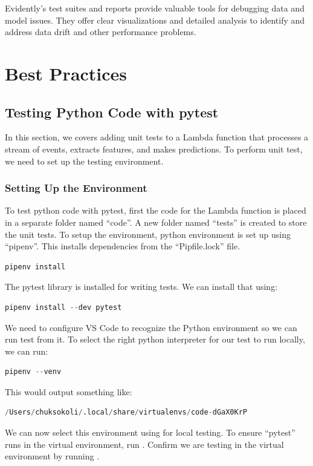 \documentclass[letterpaper,12pt,notitlepage,twoside]{report}
\begin{document}
Evidently's test suites and reports provide valuable tools for debugging data and model issues. They offer clear visualizations and detailed analysis to identify and address data drift and other performance problems.

\chapter{Best Practices} \label{ch:6}

\section{Testing Python Code with pytest}
In this section, we covers adding unit tests to a Lambda function that processes a stream of events, extracts features, and makes predictions. To perform unit test, we need to set up the testing environment. 
\subsection*{Setting Up the Environment}
To test python code with pytest, first the code for the Lambda function is placed in a separate folder named ``code''. A new folder named ``tests'' is created to store the unit tests. To setup the environment,  python environment is set up using ``pipenv''. This installs dependencies from the ``Pipfile.lock'' file.
\begin{lstlisting}[language=python, numbers=none]
pipenv install
\end{lstlisting}

The pytest library is installed for writing tests. We can install that using:
\begin{lstlisting}[language=python, numbers=none]
pipenv install --dev pytest
\end{lstlisting}

We need to configure VS Code to recognize the Python environment so we can run test from it.  To select the right python interpreter for our test to run locally, we can run:
\begin{lstlisting}[language=python, numbers=none]
pipenv --venv
\end{lstlisting}
This would output something like:
\begin{lstlisting}[language=python, numbers=none]
/Users/chuksokoli/.local/share/virtualenvs/code-dGaX0KrP
\end{lstlisting}
We can now select this environment using  for local testing. To ensure ``pytest'' runs in the virtual environment, run . Confirm we are testing in the virtual environment by running . 
\end{document}
